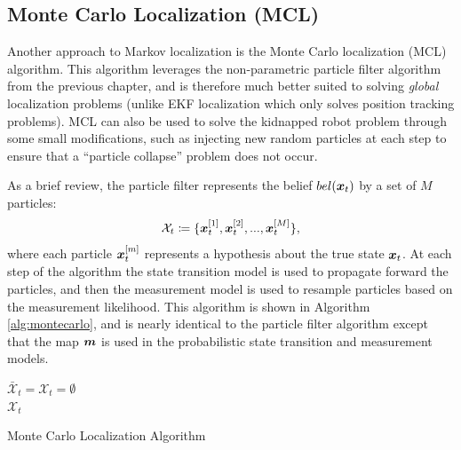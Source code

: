 \subsection{Monte Carlo Localization (MCL)}
Another approach to Markov localization is the Monte Carlo localization (MCL) algorithm. This algorithm leverages the non-parametric particle filter algorithm from the previous chapter, and is therefore much better suited to solving \textit{global} localization problems (unlike EKF localization which only solves position tracking problems). MCL can also be used to solve the kidnapped robot problem through some small modifications, such as injecting new random particles at each step to ensure that a ``particle collapse'' problem does not occur.

As a brief review, the particle filter represents the belief $bel(\bm{x}_t)$ by a set of $M$ particles:
\begin{equation*}
\mathcal{X}_t \coloneqq \{\bm{x}_t^{[1]}, \bm{x}_t^{[2]},..., \bm{x}_t^{[M]}\},
\end{equation*}
where each particle $\bm{x}_t^{[m]}$ represents a hypothesis about the true state $\bm{x}_t$. At each step of the algorithm the state transition model is used to propagate forward the particles, and then the measurement model is used to resample particles based on the measurement likelihood. This algorithm is shown in Algorithm \ref{alg:montecarlo}, and is nearly identical to the particle filter algorithm except that the map $\bm{m}$ is used in the probabilistic state transition and measurement models.
\begin{algorithm}[ht]
 $\bar{\mathcal{X}}_{t} = \mathcal{X}_t = \emptyset$\\
 \Return $\mathcal{X}_t$
 \caption{Monte Carlo Localization Algorithm}
 \label{alg:montecarlo}
\end{algorithm}